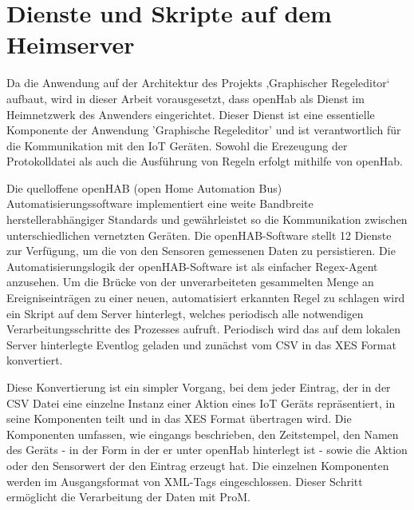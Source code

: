 \section{Dienste und Skripte auf dem Heimserver}
Da die Anwendung auf der Architektur des Projekts ‚Graphischer Regeleditor‘ aufbaut, wird in dieser Arbeit vorausgesetzt, dass openHab als Dienst im Heimnetzwerk des Anwenders eingerichtet. Dieser Dienst ist eine essentielle Komponente der Anwendung 'Graphische Regeleditor' und ist verantwortlich für die Kommunikation mit den IoT Geräten. Sowohl die Erezeugung der Protokolldatei als auch die Ausführung von Regeln erfolgt mithilfe von openHab. 

Die quelloffene openHAB (open Home Automation Bus) Automatisierungssoftware implementiert eine weite Bandbreite herstellerabhängiger Standards und gewährleistet so die Kommunikation zwischen unterschiedlichen vernetzten Geräten. Die openHAB-Software stellt 12 Dienste zur Verfügung, um die von den Sensoren gemessenen Daten zu persistieren. Die Automatisierungslogik der openHAB-Software ist als einfacher Regex-Agent anzusehen. 
Um die Brücke von der unverarbeiteten gesammelten Menge an Ereigniseinträgen zu einer neuen, automatisiert erkannten Regel zu schlagen wird ein Skript auf dem Server hinterlegt, welches periodisch alle notwendigen Verarbeitungsschritte des Prozesses aufruft. Periodisch wird das auf dem lokalen Server hinterlegte Eventlog geladen und zunächst vom CSV in das XES Format konvertiert. 

Diese Konvertierung ist ein simpler Vorgang, bei dem jeder Eintrag, der in der CSV Datei eine einzelne Instanz einer Aktion eines IoT Geräts repräsentiert, in seine Komponenten teilt und in das XES Format übertragen wird. Die Komponenten umfassen, wie eingangs beschrieben, den Zeitstempel, den Namen des Geräts - in der Form in der er unter openHab hinterlegt ist - sowie die Aktion oder den Sensorwert der den Eintrag erzeugt hat. Die einzelnen Komponenten werden im Ausgangsformat von XML-Tags eingeschlossen. Dieser Schritt ermöglicht die Verarbeitung der Daten mit ProM.


